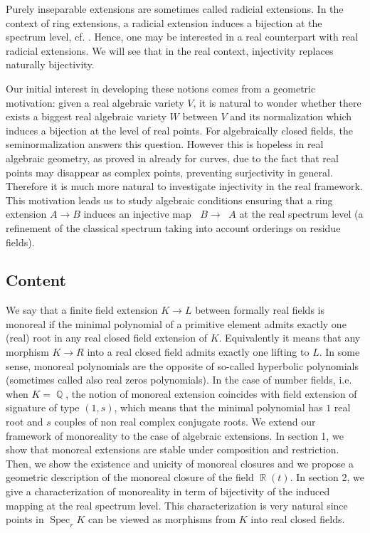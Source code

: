 \documentclass[12pt]{amsart}
\theoremstyle{definition}
\DeclareMathOperator{\R}{\mathbb R}
\DeclareMathOperator{\QQ}{\mathbb Q}
\DeclareMathOperator{\Sp}{Spec}
\DeclareMathOperator{\Spr}{Spec_r}
\begin{document}
Purely inseparable extensions are sometimes called radicial extensions. In the context of ring extensions, a radicial extension induces a bijection at the spectrum level, cf. \cite{Gr1}. Hence, one may be interested in a real counterpart with real radicial extensions. We will see that in the real context, injectivity replaces naturally bijectivity.


Our initial interest in developing these notions comes from a geometric motivation: given a real algebraic variety $V$, it is natural to wonder whether there exists a biggest real algebraic variety $W$ between $V$ and its normalization which induces a bijection at the level of real points. For algebraically closed fields, the seminormalization answers this question. However this is hopeless in real algebraic geometry, as proved in \cite{FMQsemi} already for curves, due to the fact that real points may disappear as complex points, preventing surjectivity in general.  Therefore it is much more natural to investigate injectivity in the real framework. This motivation leads us to  study algebraic conditions ensuring that a ring extension $A\to B$ induces an injective map $\Spr B\to \Spr A$ at the real spectrum level (a refinement of the classical spectrum taking into account orderings on residue fields).


\subsection*{Content}
We say that a finite field extension $K\to L$ between formally real fields is monoreal if the minimal polynomial of a primitive element admits exactly one (real) root in any real closed field extension of $K$. Equivalently it means that any morphism $K\to R$ into a real closed field admits exactly one lifting to $L$. In some sense, monoreal polynomials are the opposite of  so-called hyperbolic polynomials (sometimes called also real zeros polynomials).
In the case of number fields, i.e. when $K=\QQ$, the notion of monoreal extension coincides with field extension of signature of type $(1,s)$, which means that the minimal polynomial has $1$ real root and $s$ couples of non real complex conjugate roots. 
We extend our framework of monoreality to the case of algebraic extensions.
In section 1, we show that monoreal extensions are stable under composition and restriction. Then, we show the existence and unicity of monoreal closures 
and we propose a geometric description of the monoreal closure of the field $\R(t)$.
In section 2, we give a characterization of monoreality in term of bijectivity of the induced mapping at the real spectrum level. This characterization is very natural since points in $\Sp_r K$ can be viewed as morphisms from $K$ into real closed fields.  
\end{document}
